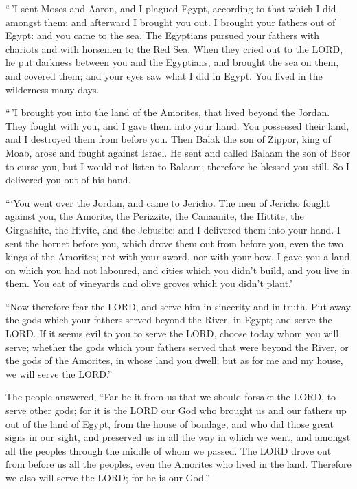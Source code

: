  ``\,'I sent Moses and Aaron, and I plagued Egypt, according
to that which I did amongst them: and afterward I brought you out.
 I brought your fathers out of Egypt: and you came to the
sea. The Egyptians pursued your fathers with chariots and with horsemen
to the Red Sea.  When they cried out to the LORD, he put
darkness between you and the Egyptians, and brought the sea on them, and
covered them; and your eyes saw what I did in Egypt. You lived in the
wilderness many days.

 ``\,'I brought you into the land of the Amorites, that
lived beyond the Jordan. They fought with you, and I gave them into your
hand. You possessed their land, and I destroyed them from before you.
 Then Balak the son of Zippor, king of Moab, arose and
fought against Israel. He sent and called Balaam the son of Beor to
curse you,  but I would not listen to Balaam; therefore he
blessed you still. So I delivered you out of his hand.

 ```You went over the Jordan, and came to Jericho. The men
of Jericho fought against you, the Amorite, the Perizzite, the
Canaanite, the Hittite, the Girgashite, the Hivite, and the Jebusite;
and I delivered them into your hand.  I sent the hornet
before you, which drove them out from before you, even the two kings of
the Amorites; not with your sword, nor with your bow.  I
gave you a land on which you had not laboured, and cities which you
didn't build, and you live in them. You eat of vineyards and olive
groves which you didn't plant.'

 ``Now therefore fear the LORD, and serve him in sincerity
and in truth. Put away the gods which your fathers served beyond the
River, in Egypt; and serve the LORD.  If it seems evil to
you to serve the LORD, choose today whom you will serve; whether the
gods which your fathers served that were beyond the River, or the gods
of the Amorites, in whose land you dwell; but as for me and my house, we
will serve the LORD.''

 The people answered, ``Far be it from us that we should
forsake the LORD, to serve other gods;  for it is the LORD
our God who brought us and our fathers up out of the land of Egypt, from
the house of bondage, and who did those great signs in our sight, and
preserved us in all the way in which we went, and amongst all the
peoples through the middle of whom we passed.  The LORD
drove out from before us all the peoples, even the Amorites who lived in
the land. Therefore we also will serve the LORD; for he is our God.''

